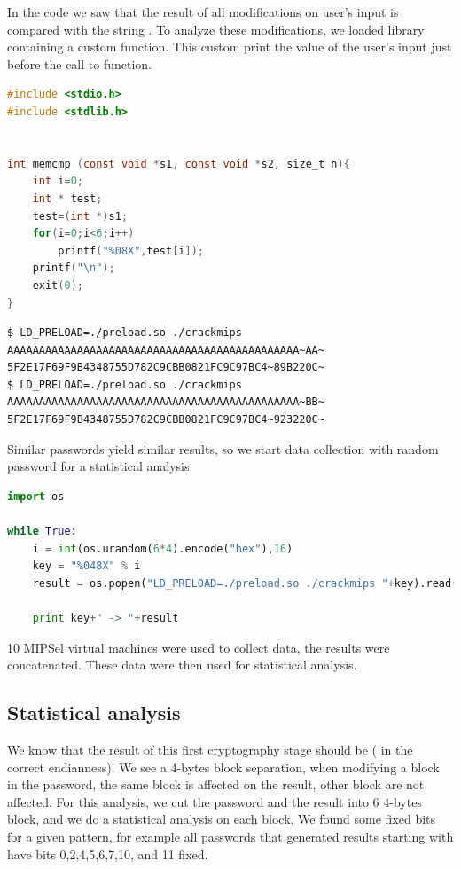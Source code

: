\documentclass[a4paper]{article}
\begin{document}
In the code we saw that the result of all modifications on user's input is compared with the string . To analyze these modifications, we loaded library containing a custom  function. This custom  print the value of the user's input just before the call to  function.

\begin{lstlisting}[language=C,caption={LD\_PRELOAD library},numbers=none]
#include <stdio.h>
#include <stdlib.h>


int memcmp (const void *s1, const void *s2, size_t n){
	int i=0;
	int * test;
	test=(int *)s1;
	for(i=0;i<6;i++)
		printf("%08X",test[i]);
	printf("\n");
	exit(0);
}
\end{lstlisting}



\begin{lstlisting}[caption={},numbers=none,style=colortilde]
$ LD_PRELOAD=./preload.so ./crackmips AAAAAAAAAAAAAAAAAAAAAAAAAAAAAAAAAAAAAAAAAAAAAA~AA~
5F2E17F69F9B4348755D782C9CBB0821FC9C97BC4~89B220C~
$ LD_PRELOAD=./preload.so ./crackmips AAAAAAAAAAAAAAAAAAAAAAAAAAAAAAAAAAAAAAAAAAAAAA~BB~
5F2E17F69F9B4348755D782C9CBB0821FC9C97BC4~923220C~
\end{lstlisting}

Similar passwords yield similar results, so we start data collection with random password for a statistical analysis.

\begin{lstlisting}[language=python,caption={Collecting data},numbers=none]
import os

while True:
	i = int(os.urandom(6*4).encode("hex"),16)
	key = "%048X" % i
	result = os.popen("LD_PRELOAD=./preload.so ./crackmips "+key).read().replace("\n","")

	print key+" -> "+result
\end{lstlisting}

10 MIPSel virtual machines were used to collect data, the results were concatenated. These data were then used for statistical analysis.
\newpage
\subsection{Statistical analysis}


We know that the result of this first cryptography stage should be  ( in the correct endianness). We see a 4-bytes block separation, when modifying a block in the password, the same block is affected on the result, other block are not affected. For this analysis, we cut the password and the result into 6 4-bytes block, and we do a statistical analysis on each block.\newline
We found some fixed bits for a given pattern, for example all passwords that generated results starting with  have bits 0,2,4,5,6,7,10, and 11 fixed.
\end{document}
